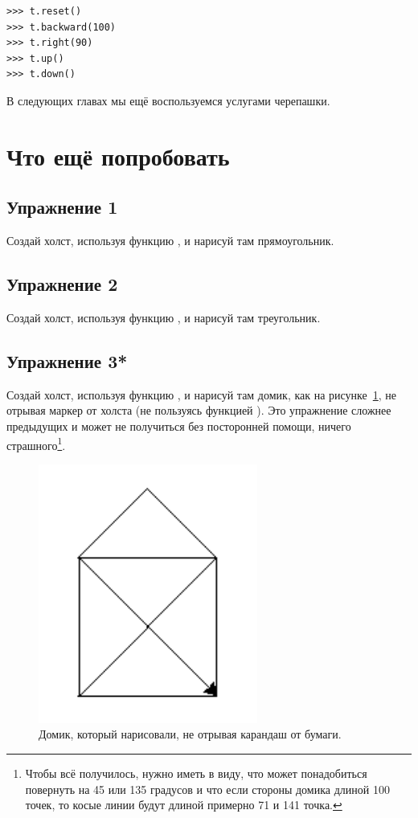 \begin{listing}
\begin{verbatim}
>>> t.reset()
>>> t.backward(100)
>>> t.right(90)
>>> t.up()
>>> t.down()
\end{verbatim}
\end{listing}

В следующих главах мы ещё воспользуемся услугами черепашки.

\section{Что ещё попробовать}


\subsection*{Упражнение 1}
Создай холст, используя функцию , и нарисуй там прямоугольник.

\subsection*{Упражнение 2}
Создай холст, используя функцию , и нарисуй там треугольник.

\subsection*{Упражнение 3*}
Создай холст, используя функцию , и нарисуй там домик, как на рисунке \ref{fighouse}, не отрывая маркер от холста (не пользуясь функцией ). Это упражнение сложнее предыдущих и может не получиться без посторонней помощи, ничего страшного\footnote{Чтобы всё получилось, нужно иметь в виду, что может понадобиться повернуть на 45 или 135 градусов и что если стороны домика длиной 100 точек, то косые линии будут длиной примерно 71 и 141 точка.}.

\begin{figure}
\begin{center}
\includegraphics[width=72mm]{03.house.png}
\end{center}
\caption{Домик, который нарисовали, не отрывая карандаш от бумаги.}\label{fighouse}
\end{figure}

\newpage
